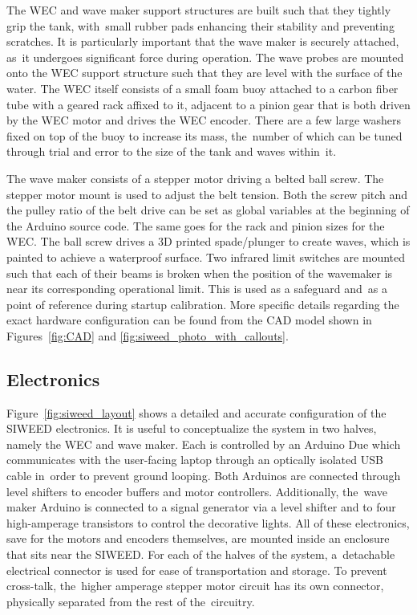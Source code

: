 \documentclass[hardware,article,submit,pdftex,moreauthors]{Definitions/mdpi}
\begin{document}
The WEC and wave maker support structures are built such that they tightly grip the tank, with~small rubber pads enhancing their stability and preventing scratches.
It is particularly important that the wave maker is securely attached, as~it undergoes significant force during operation.
The wave probes are mounted onto the WEC support structure such that they are level with the surface of the water.
The WEC itself consists of a small foam buoy attached to a carbon fiber tube with a geared rack affixed to it, adjacent to a pinion gear that is both driven by the WEC motor and drives the WEC encoder.
There are a few large washers fixed on top of the buoy to increase its mass, the~number of which can be tuned through trial and error to the size of the tank and waves within~it.


The wave maker consists of a stepper motor driving a belted ball screw.
The stepper motor mount is used to adjust the belt tension.
Both the screw pitch and the pulley ratio of the belt drive can be set as global variables at the beginning of the Arduino source code.
The same goes for the rack and pinion sizes for the WEC.
The ball screw drives a 3D printed spade/plunger to create waves, which is painted to achieve a waterproof surface.
Two infrared limit switches are mounted such that each of their beams is broken when the position of the wavemaker is near its corresponding operational limit.
This is used as a safeguard and~as a point of reference during startup calibration.
More specific details regarding the exact hardware configuration can be found from the CAD model shown in Figures~\ref{fig:CAD} and \ref{fig:siweed_photo_with_callouts}.

\subsection{Electronics}
Figure~\ref{fig:siweed_layout} shows a detailed and accurate configuration of the SIWEED electronics.
It is useful to conceptualize the system in two halves, namely the WEC and wave maker.
Each is controlled by an Arduino Due which communicates with the user-facing laptop through an optically isolated USB cable in~order to prevent ground looping.
Both Arduinos are connected through level shifters to encoder buffers and motor controllers.
Additionally, the~wave maker Arduino is connected to a signal generator via a level shifter and to four high-amperage transistors to control the decorative lights.
All of these electronics, save for the motors and encoders themselves, are mounted inside an enclosure that sits near the SIWEED.
For each of the halves of the system, a~detachable electrical connector is used for ease of transportation and storage.
To prevent cross-talk, the~higher amperage stepper motor circuit has its own connector, physically separated from the rest of the~circuitry.
\end{document}

